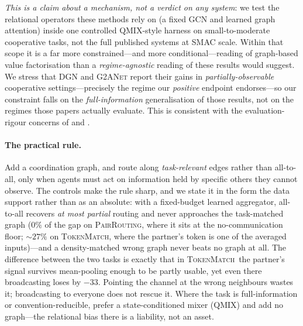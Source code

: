 \documentclass[manuscript, screen, review]{jair}
\providecommand{\citep}{\parencite}
\newcommand{\algoname}[1]{\textsc{#1}}
\newcommand{\qmix}{\algoname{QMIX}}
\newcommand{\pairrouting}{\textsc{PairRouting}}
\newcommand{\tokenmatch}{\textsc{TokenMatch}}
\begin{document}
\emph{This is a claim about a mechanism, not a verdict on any system}: we
test the relational operators these methods rely on (a fixed GCN and learned
graph attention) inside one controlled QMIX-style harness on
small-to-moderate cooperative tasks, not the full published systems at SMAC
scale. Within that scope it is a far more constrained---and more
conditional---reading of graph-based value factorisation than a
\emph{regime-agnostic} reading of these results
\citep{jiang_2020_dgn,liu_2020_g2anet,naderializadeh_2020_graphmix}
would suggest. We stress that \algoname{DGN} and \algoname{G2ANet} report
their gains in \emph{partially-observable} cooperative settings---precisely
the regime our \emph{positive} endpoint endorses---so our constraint falls on
the \emph{full-information} generalisation of those results, not on the
regimes those papers actually evaluate. This is consistent with the
evaluation-rigour concerns of
\citet{henderson_2018_drlmatters} and \citet{agarwal_2021_precipice}.

\paragraph{The practical rule.} Add a coordination graph, and route along
\emph{task-relevant} edges rather than all-to-all, only when agents must act
on information held by specific others they cannot observe. The controls make
the rule sharp, and we state it in the form the data support rather than as an
absolute: with a fixed-budget learned aggregator, all-to-all recovers
\emph{at most partial} routing and never approaches the task-matched graph
($0\%$ of the gap on \pairrouting, where it sits at the no-communication floor;
${\sim}27\%$ on \tokenmatch, where the partner's token is one of the averaged
inputs)---and a density-matched wrong graph never beats no graph at all. The
difference between the two tasks is exactly that in \tokenmatch\ the partner's
signal survives mean-pooling enough to be partly usable, yet even there
broadcasting loses by $-33$. Pointing the channel at the wrong neighbours wastes
it; broadcasting to everyone does not rescue it. Where the
task is full-information or convention-reducible, prefer a state-conditioned
mixer (\qmix) and add no graph---the relational bias there is a liability,
not an asset.
\end{document}
